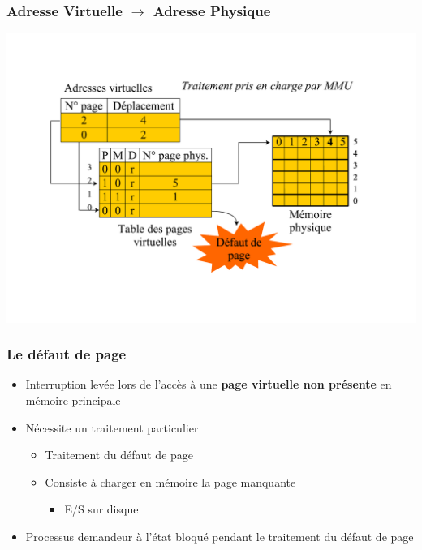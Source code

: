 \begin{frame}
\frametitle{Adresse Virtuelle $\rightarrow$ Adresse Physique}
\includegraphics[width=\textwidth]{../illustration/table_pages_virtuelles_acces.pdf}
\end{frame}



\begin{frame}
\frametitle{Le défaut de page}
\begin{itemize}
\item Interruption levée lors de l'accès à une \textbf{page virtuelle non présente} en mémoire principale
\item Nécessite un traitement particulier
\begin{itemize}
\item Traitement du défaut de page
\item Consiste à charger en mémoire la page manquante
\begin{itemize}
\item E/S sur disque
\end{itemize}
\end{itemize}
\item Processus demandeur à l'état bloqué pendant le traitement du défaut de page

\end{itemize}
\end{frame}




